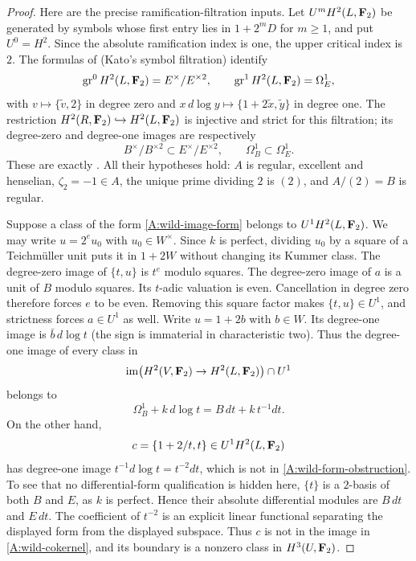 \begin{proof}
Here are the precise ramification-filtration inputs. Let
$U^mH^2(L,\mathbf F_2)$ be generated by symbols whose first entry lies in
$1+2^mD$ for $m\geq1$, and put $U^0=H^2$.
Since the absolute ramification index is one, the upper critical index
is $2$. The formulas of
\citet[Proposition 6.1.2(i),(iii)]{A_Suzuki2024}
(Kato's symbol filtration) identify
\[
 \operatorname{gr}^0H^2(L,\mathbf F_2)=E^\times/E^{\times2},\qquad
 \operatorname{gr}^1H^2(L,\mathbf F_2)=\Omega^1_E,
\]
with $v\mapsto\{\widetilde v,2\}$ in degree zero and
$x\,d\log y\mapsto\{1+2\widetilde x,\widetilde y\}$ in degree one.
The restriction $H^2(R,\mathbf F_2)\hookrightarrow H^2(L,\mathbf F_2)$ is injective
and strict for this filtration; its degree-zero and degree-one images
are respectively
\[
 B^\times/B^{\times2}\subset E^\times/E^{\times2},\qquad
 \Omega^1_B\subset\Omega^1_E.
\]
These are exactly
\citet[Propositions 8.1.4, 8.2.1(i),(iii), and 8.2.3]{A_Suzuki2024}.
All their hypotheses hold: $A$ is regular, excellent and henselian,
$\zeta_2=-1\in A$, the unique prime dividing $2$ is $(2)$, and
$A/(2)=B$ is regular.

Suppose a class of the form \eqref{A:wild-image-form} belongs to
$U^1H^2(L,\mathbf F_2)$. We may write $u=2^e u_0$ with $u_0\in W^\times$.
Since $k$ is perfect, dividing $u_0$ by a square of a Teichm\"uller
unit puts it in $1+2W$ without changing its Kummer class.
The degree-zero image of $\{t,u\}$ is $t^e$ modulo squares.
The degree-zero image of $a$ is a unit of $B$ modulo squares.
Its $t$-adic valuation is even. Cancellation in degree zero therefore
forces $e$ to be even. Removing this square factor makes
$\{t,u\}\in U^1$, and strictness forces $a\in U^1$ as well.
Write $u=1+2b$ with $b\in W$. Its degree-one image is
$\bar b\,d\log t$ (the sign is immaterial in characteristic two).
Thus the degree-one image of every class in
\[
 \operatorname{im}\bigl(H^2(V,\mathbf F_2)\to H^2(L,\mathbf F_2)\bigr)\cap U^1
\]
belongs to
\begin{equation}\label{A:wild-form-obstruction}
 \Omega^1_B+k\,d\log t=B\,dt+k\,t^{-1}dt.
\end{equation}
On the other hand,
\[
 c=\{1+2/t,t\}\in U^1H^2(L,\mathbf F_2)
\]
has degree-one image $t^{-1}d\log t=t^{-2}dt$, which is not in
\eqref{A:wild-form-obstruction}. To see that no differential-form
qualification is hidden here, $\{t\}$ is a $2$-basis of both $B$ and
$E$, as $k$ is perfect. Hence their absolute differential modules are
$B\,dt$ and $E\,dt$. The coefficient of $t^{-2}$ is an explicit
linear functional separating the displayed form from the displayed
subspace. Thus $c$ is not in the image in \eqref{A:wild-cokernel}, and
its boundary is a nonzero class in $H^3(U,\mathbf F_2)$.
\end{proof}

